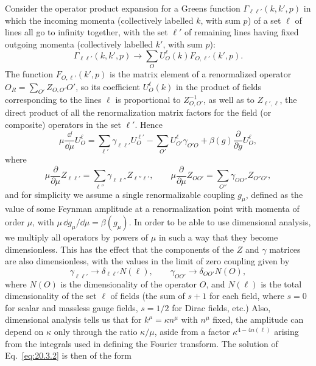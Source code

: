 Consider the operator product expansion for a Greens function $\Gamma_{\ell\ell'}(k,k',p)$ in which the incoming momenta (collectively labelled $k$, with sum $p$) of a set $\ell$ of lines all go to infinity together, with the set $\ell'$ of remaining lines having fixed outgoing momenta (collectively labelled $k'$, with sum $p$):
\begin{equation}
\Gamma_{\ell\ell'}(k,k',p)\longrightarrow
\sum_O U_O^\ell(k)F_{O,\ell'}(k',p).
\tag{20.3.1}\label{eq:20.3.1}
\end{equation}
The function $F_{O,\ell'}(k',p)$ is the matrix element of a renormalized operator
$O_R=\sum_{O'}Z_{O,O'}O'$, so its coefficient $U_O^\ell(k)$ in the product of fields corresponding to the lines $\ell$ is proportional to $Z^{-1}_{O,O'}$, as well as to $Z_{\ell',\ell}$, the direct product of all the renormalization matrix factors for the field (or composite) operators in the set $\ell'$. Hence
\begin{equation}
\mu\frac{\dd}{\dd\mu}U_O^\ell
=\sum_{\ell'}\gamma_{\ell\ell'}U_O^{\ell'}
-\sum_{O'}U_{O'}^\ell\gamma_{O'O}
+\beta(g)\frac{\partial}{\partial g}U_O^\ell,
\tag{20.3.2}\label{eq:20.3.2}
\end{equation}
where
\begin{equation}
\mu\frac{\partial}{\partial\mu}Z_{\ell\ell'}
=\sum_{\ell''}\gamma_{\ell\ell''}Z_{\ell''\ell'},
\qquad
\mu\frac{\partial}{\partial\mu}Z_{OO'}
=\sum_{O''}\gamma_{OO''}Z_{O''O'},
\tag{20.3.3}\label{eq:20.3.3}
\end{equation}
and for simplicity we assume a single renormalizable coupling $g_\mu$, defined as the value of some Feynman amplitude at a renormalization point with momenta of order $\mu$, with $\mu\,\dd g_\mu/\dd\mu=\beta(g_\mu)$. In order to be able to use dimensional analysis, we multiply all operators by powers of $\mu$ in such a way that they become dimensionless. This has the effect that the components of the $Z$ and $\gamma$ matrices are also dimensionless, with the values in the limit of zero coupling given by
\begin{equation}
\gamma_{\ell\ell'}\longrightarrow\delta_{\ell\ell'}N(\ell),
\qquad
\gamma_{OO'}\longrightarrow\delta_{OO'}N(O),
\tag{20.3.4}\label{eq:20.3.4}
\end{equation}
where $N(O)$ is the dimensionality of the operator $O$, and $N(\ell)$ is the total dimensionality of the set $\ell$ of fields (the sum of $s+1$ for each field, where $s=0$ for scalar and massless gauge fields, $s=1/2$ for Dirac fields, etc.) Also, dimensional analysis tells us that for $k^\mu=\kappa n^\mu$ with $n^\mu$ fixed, the amplitude can depend on $\kappa$ only through the ratio $\kappa/\mu$, aside from a factor $\kappa^{4-4n(\ell)}$ arising from the integrals used in defining the Fourier transform. The solution of Eq.~\eqref{eq:20.3.2} is then of the form
